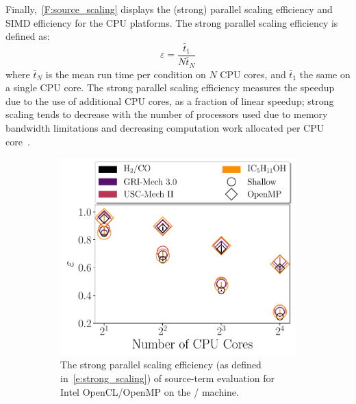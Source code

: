\documentclass[12pt,number,sort&compress,preprint]{elsarticle}
\begin{document}
Finally,~\cref{F:source_scaling} displays the (strong) parallel scaling efficiency and SIMD efficiency for the CPU platforms.
The strong parallel scaling efficiency is defined as:
\begin{equation}
 \label{e:strong_scaling}
 \varepsilon = \frac{\bar{t}_{1}}{N \bar{t}_{N}}
\end{equation}
where $\bar{t}_{N}$ is the mean run time per condition on $N$ CPU cores, and $\bar{t}_{1}$ the same on a single CPU core.
The strong parallel scaling efficiency measures the speedup due to the use of additional CPU cores, as a fraction of linear speedup; strong scaling tends to decrease with the number of processors used due to memory bandwidth limitations and decreasing computation work allocated per CPU core~\cite{strong_scaling}.

\begin{figure}[htbp]
   \centering
  \begin{subfigure}[t]{0.48\linewidth}
      \includegraphics[width=\textwidth]{source_parallel_scaling.pdf}
      \caption{The strong parallel scaling efficiency (as defined in~\cref{e:strong_scaling}) of source-term evaluation for Intel OpenCL\slash OpenMP on the \avx/ machine.}
      \label{F:source_parallel_scaling}
  \end{subfigure}
  \hfill
  \begin{subfigure}[t]{0.48\linewidth}

\end{subfigure}
\end{figure}
\end{document}
